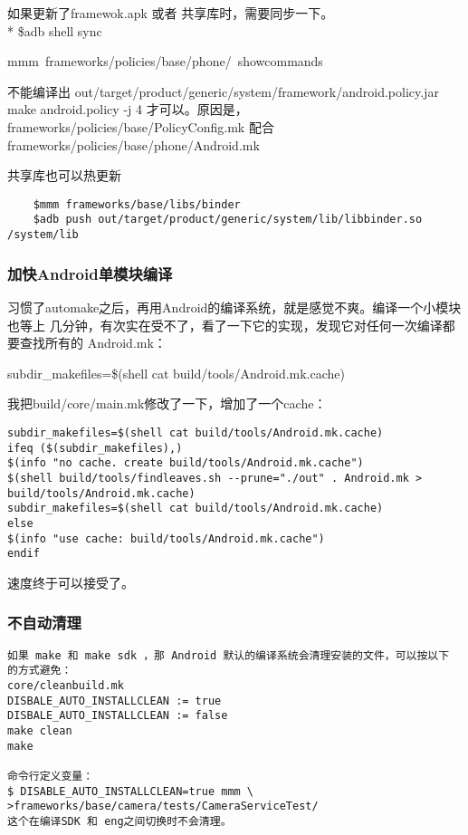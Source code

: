 \documentclass[a4paper,titlepage]{article}
\begin{document}
如果更新了framewok.apk 或者 共享库时，需要同步一下。
\\* \$adb shell sync

\mbox{mmm frameworks/policies/base/phone/ showcommands}

不能编译出 out/target/product/generic/system/framework/android.policy.jar
make android.policy -j 4
才可以。原因是， frameworks/policies/base/PolicyConfig.mk 配合  frameworks/policies/base/phone/Android.mk

共享库也可以热更新
\begin{lstlisting}
    $mmm frameworks/base/libs/binder
    $adb push out/target/product/generic/system/lib/libbinder.so  /system/lib
\end{lstlisting}

\subsubsection{加快Android单模块编译}
习惯了automake之后，再用Android的编译系统，就是感觉不爽。编译一个小模块也等上
几分钟，有次实在受不了，看了一下它的实现，发现它对任何一次编译都要查找所有的
Android.mk：

subdir_makefiles=\$(shell cat build/tools/Android.mk.cache)

我把build/core/main.mk修改了一下，增加了一个cache：
\begin{lstlisting}
subdir_makefiles=$(shell cat build/tools/Android.mk.cache)
ifeq ($(subdir_makefiles),)
$(info "no cache. create build/tools/Android.mk.cache")
$(shell build/tools/findleaves.sh --prune="./out" . Android.mk > build/tools/Android.mk.cache)
subdir_makefiles=$(shell cat build/tools/Android.mk.cache)
else
$(info "use cache: build/tools/Android.mk.cache")
endif
\end{lstlisting}

速度终于可以接受了。

\subsubsection{不自动清理}
\begin{Verbatim}
如果 make 和 make sdk ，那 Android 默认的编译系统会清理安装的文件，可以按以下
的方式避免：
core/cleanbuild.mk   
DISBALE_AUTO_INSTALLCLEAN := true
DISBALE_AUTO_INSTALLCLEAN := false
make clean
make

命令行定义变量：
$ DISABLE_AUTO_INSTALLCLEAN=true mmm \
>frameworks/base/camera/tests/CameraServiceTest/
这个在编译SDK 和 eng之间切换时不会清理。
\end{Verbatim}
\end{document}
